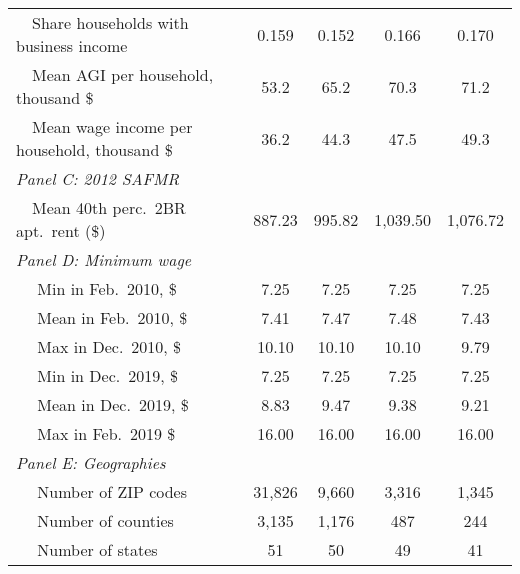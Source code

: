 \begin{landscape}
\begin{table}[hbt!]
\begin{tabular}{@{}lcccc@{}}
        $\quad$Share households with business income        & 0.159    & 0.152   & 0.166   & 0.170          \\
        $\quad$Mean AGI per household, thousand \$          & 53.2 & 65.2 & 70.3 & 71.2     \\
        $\quad$Mean wage income per household, thousand \$  & 36.2 & 44.3 & 47.5 & 49.3     \\
        \textit{Panel C: 2012 SAFMR}                        &       &       &        &           \\
        $\quad$Mean 40th perc.\ 2BR apt.\ rent (\$)         & 887.23   & 995.82  & 1,039.50  & 1,076.72     \\
        \textit{Panel D: Minimum wage}                       &       &       &        &           \\
        $\quad$ Min in Feb.\ 2010, \$                        & 7.25   & 7.25  & 7.25  & 7.25                \\
        $\quad$ Mean in Feb.\ 2010, \$                       & 7.41   & 7.47  & 7.48  & 7.43                \\
        $\quad$ Max in Dec.\ 2010, \$                        & 10.10   & 10.10  & 10.10  & 9.79              \\
        $\quad$ Min in Dec.\ 2019, \$                        & 7.25   & 7.25  & 7.25  & 7.25                \\
        $\quad$ Mean in Dec.\ 2019, \$                       & 8.83   & 9.47  & 9.38  & 9.21                \\
        $\quad$ Max in Feb.\ 2019 \$                         & 16.00   & 16.00  & 16.00  & 16.00              \\
        \textit{Panel E: Geographies}                       &       &       &        &           \\
        $\quad$ Number of ZIP codes                         & 31,826  & 9,660 & 3,316 & 1,345               \\
        $\quad$ Number of counties                          & 3,135  & 1,176 & 487 & 244               \\
        $\quad$ Number of states                            & 51  & 50 & 49 & 41               \\ \bottomrule
    \end{tabular}


\end{table}
\end{landscape}
